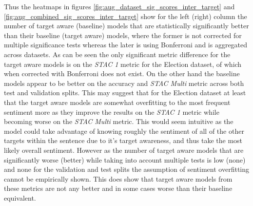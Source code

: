 Thus the heatmaps in figures \ref{fig:aug_dataset_sig_scores_inter_target} and \ref{fig:aug_combined_sig_scores_inter_target} show for the left (right) column the number of target aware (baseline) models that are statistically significantly better than their baseline (target aware) models, where the former is not corrected for multiple significance tests whereas the later is using
Bonferroni and is aggregated across datasets. As can be seen the only significant metric difference for the target aware models is on the \textit{STAC 1} metric for the Election dataset, of which when corrected with Bonferroni does not exist. On the other hand the baseline models appear to be better on the accuracy and \textit{STAC Multi} metric across both test and validation splits. This may suggest that for the Election dataset at least that the target aware models are somewhat overfitting to the most frequent sentiment more as they improve the results on the \textit{STAC 1} metric while becoming worse on the \textit{STAC Multi} metric. This would seem intuitive as the model could take advantage of knowing roughly the sentiment of all of the other targets within the sentence due to it's target awareness, and thus take the most likely overall sentiment. However as the number of target aware models that are significantly worse (better) while taking into account multiple tests is low (none) and none for the validation and test splits the assumption of sentiment overfitting cannot be empirically shown. This does show that target aware models from these metrics are not any better and in some cases worse than their baseline equivalent.

